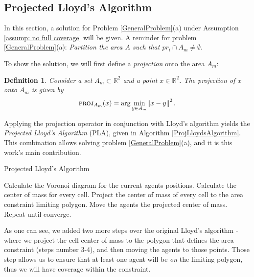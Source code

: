 \documentclass{iacas}
\newtheorem{definition}{Definition}
\begin{document}
\subsection{Projected Lloyd's Algorithm}
In this section, a solution for Problem \ref{GeneralProblem}(a) under Assumption \ref{assump: no full coverage} will be given. A reminder for problem \ref{GeneralProblem}(a): 
\emph{Partition the area $A$ such that $pr_i \cap A_m \neq \emptyset$}.

To show the solution, we will first define a \emph{projection} onto the area $A_m$:
\begin{definition}
Consider a set $A_m \subset \mathbb{R}^2$ and a point $x \in \mathbb{R}^2$.  The \emph{projection} of $x$ onto $A_m$ is given by
$$\textsc{proj}_{A_m}(x) = \arg\min_{y \in A_m} \norm{x-y}^2.$$
\label{def:projection operator}
\end{definition}

Applying the projection operator in conjunction with Lloyd's algorithm yields the \emph{Projected Lloyd's Algorithm} (PLA), given in Algorithm \ref{ProjLloydsAlgorithm}. This combination allows solving problem \ref{GeneralProblem}(a), and it is this work's main contribution.%
\begin{algorithm}
\caption{Projected Lloyd's Algorithm}\label{ProjLloydsAlgorithm}
\begin{algorithmic}[1]
\State Calculate the Voronoi diagram for the current agents positions.
\State Calculate the center of mass for every cell.
\State Project the center of mass of every cell to the area constraint limiting polygon.
\State Move the agents the projected center of mass.
\State Repeat until converge.
\end{algorithmic}
\label{algo:PLA}
\end{algorithm}

As one can see, we added two more steps over the original Lloyd's algorithm - where we project the cell center of mass to the polygon that defines the area constraint (steps number 3-4), and then moving the agents to those points. Those step allows us to ensure that at least one agent will be \emph{on} the limiting polygon, thus we will have coverage within the constraint.
\end{document}
